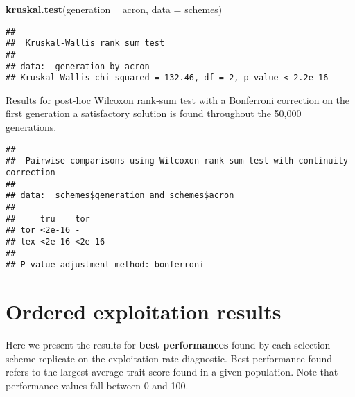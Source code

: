 \documentclass[]{book}
\newenvironment{Shaded}{\begin{snugshade}}{\end{snugshade}}
\newcommand{\DataTypeTok}[1]{\textcolor[rgb]{0.13,0.29,0.53}{#1}}
\newcommand{\KeywordTok}[1]{\textcolor[rgb]{0.13,0.29,0.53}{\textbf{#1}}}
\newcommand{\NormalTok}[1]{#1}
\newcommand{\OperatorTok}[1]{\textcolor[rgb]{0.81,0.36,0.00}{\textbf{#1}}}
\newcommand{\OtherTok}[1]{\textcolor[rgb]{0.56,0.35,0.01}{#1}}
\newcommand{\StringTok}[1]{\textcolor[rgb]{0.31,0.60,0.02}{#1}}
\begin{document}
\begin{Shaded}
\begin{Highlighting}[]
\KeywordTok{kruskal.test}\NormalTok{(generation }\OperatorTok{~}\StringTok{ }\NormalTok{acron, }\DataTypeTok{data =}\NormalTok{ schemes)}
\end{Highlighting}
\end{Shaded}

\begin{verbatim}
## 
##  Kruskal-Wallis rank sum test
## 
## data:  generation by acron
## Kruskal-Wallis chi-squared = 132.46, df = 2, p-value < 2.2e-16
\end{verbatim}

Results for post-hoc Wilcoxon rank-sum test with a Bonferroni correction on the first generation a satisfactory solution is found throughout the 50,000 generations.

\begin{Shaded}
\end{Shaded}

\begin{verbatim}
## 
##  Pairwise comparisons using Wilcoxon rank sum test with continuity correction 
## 
## data:  schemes$generation and schemes$acron 
## 
##     tru    tor   
## tor <2e-16 -     
## lex <2e-16 <2e-16
## 
## P value adjustment method: bonferroni
\end{verbatim}

\hypertarget{ordered-exploitation-results}{%
\chapter{Ordered exploitation results}\label{ordered-exploitation-results}}

Here we present the results for \textbf{best performances} found by each selection scheme replicate on the exploitation rate diagnostic.
Best performance found refers to the largest average trait score found in a given population.
Note that performance values fall between 0 and 100.
\end{document}

